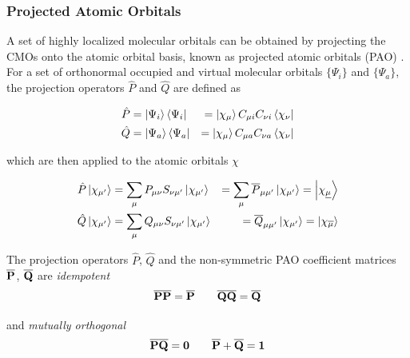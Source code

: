 
\subsubsection{Projected Atomic Orbitals}

A set of highly localized molecular orbitals can be obtained by projecting the CMOs onto the atomic orbital basis, known as projected atomic orbitals (PAO) \cite{Sae1993}. For a set of orthonormal occupied and virtual molecular orbitals $\{\Psi_i\}$ and $\{\Psi_a\}$, the projection operators $\hat{P}$ and $\hat{Q}$ are defined as \cite{Chr2006}

\begin{eqnarray}
\hat{P} &= \ket{\Psi_i} \bra{\Psi_i} &= \ket{\chi_{\mu}} C_{\mu i} C_{\nu i} \bra{\chi_{\nu}} \\
\hat{Q} &= \ket{\Psi_a} \bra{\Psi_a} &= \ket{\chi_{\mu}} C_{\mu a} C_{\nu a} \bra{\chi_{\nu}}
\end{eqnarray}

\noindent which are then applied to the atomic orbitals $\chi$ 

\begin{eqnarray}
\hat{P} \ket{\chi_{\mu'}} &= \sum_{\mu} P_{\mu\nu} S_{\nu\mu'} \ket{\chi_{\mu'}} &= \sum_{\mu} \overline{P}_{\mu \mu'} \ket{\chi_{\mu'}} = \ket{\chi_{\underline{\mu}}} \\
\hat{Q} \ket{\chi_{\mu'}} &= \sum_{\mu} Q_{\mu\nu} S_{\nu\mu'} \ket{\chi_{\mu'}}  &= \overline{Q}_{\mu \mu'} \ket{\chi_{\mu'}} = \ket{\chi_{\overline{\mu}}}
\end{eqnarray} 

The projection operators $\hat{P}$, $\hat{Q}$ and the non-symmetric PAO coefficient matrices $\mathbf{\overline{P}}$, $\mathbf{\overline{Q}}$ are \emph{idempotent}
\begin{equation}
\mathbf{\overline{P}}\mathbf{\overline{P}} = \mathbf{\overline{P}} \qquad
\mathbf{\overline{Q}}\mathbf{\overline{Q}} = \mathbf{\overline{Q}}
\end{equation}

\noindent and \emph{mutually orthogonal} 
\begin{equation}
\mathbf{\overline{P}}\mathbf{\overline{Q}} = \mathbf{0} \qquad \mathbf{\overline{P}} + \mathbf{\overline{Q}} = \mathbf{1} 
\end{equation} 

